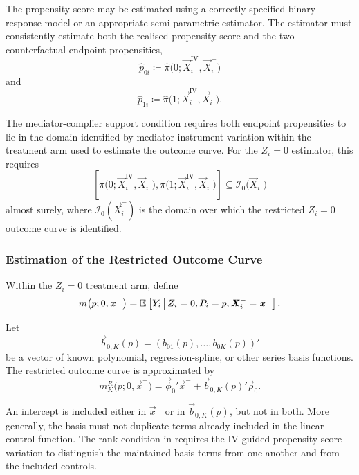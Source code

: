 The propensity score may be estimated using a correctly specified binary-response model or an appropriate semi-parametric estimator.
The estimator must consistently estimate both the realised propensity score and the two counterfactual endpoint propensities,
\[
    \widehat p_{0i}
    \coloneqq
    \widehat\pi
    \big(
        0;
        \vec X_i^{\mathrm{IV}},
        \vec X_i^-
    \big)
\]
and
\[
    \widehat p_{1i}
    \coloneqq
    \widehat\pi
    \big(
        1;
        \vec X_i^{\mathrm{IV}},
        \vec X_i^-
    \big).
\]

The mediator-complier support condition requires both endpoint propensities to lie in the domain identified by mediator-instrument variation within the treatment arm used to estimate the outcome curve.
For the $Z_i=0$ estimator, this requires
\[
    \left[
        \pi
        \big(
            0;
            \vec X_i^{\mathrm{IV}},
            \vec X_i^-
        \big),
        \pi
        \big(
            1;
            \vec X_i^{\mathrm{IV}},
            \vec X_i^-
        \big)
    \right]
    \subseteq
    \mathcal I_0
    \big(
        \vec X_i^-
    \big)
\]
almost surely, where $\mathcal I_0(\vec X_i^-)$ is the domain over which the restricted $Z_i=0$ outcome curve is identified.

\subsubsection{Estimation of the Restricted Outcome Curve}
\label{appendix:mte-estimation}

Within the $Z_i=0$ treatment arm, define
\[
    m
    \big(
        p;
        0,
        \boldsymbol{\mathit{x}}^-
    \big)
    =
    \mathbb{E}_{} \left[ 
        Y_i
     \, \middle\vert \, 
        Z_i=0,
        P_i=p,
        \boldsymbol{\mathit{X}}_i^-=\boldsymbol{\mathit{x}}^-
     \right].
\]

Let
\[
    \vec b_{0,K}(p)
    =
    \left(
        b_{01}(p),
        \ldots,
        b_{0K}(p)
    \right)'
\]
be a vector of known polynomial, regression-spline, or other series basis functions.
The restricted outcome curve is approximated by
\[
    m_K^R
    \big(
        p;
        0,
        \vec x^-
    \big)
    =
    \vec\phi_0'\vec x^-
    +
    \vec b_{0,K}(p)'\vec\rho_0.
    \label{eqn:restricted-outcome-estimation-model}
\]

An intercept is included either in $\vec x^-$ or in $\vec b_{0,K}(p)$, but not in both.
More generally, the basis must not duplicate terms already included in the linear control function.
The rank condition in  requires the IV-guided propensity-score variation to distinguish the maintained basis terms from one another and from the included controls.


